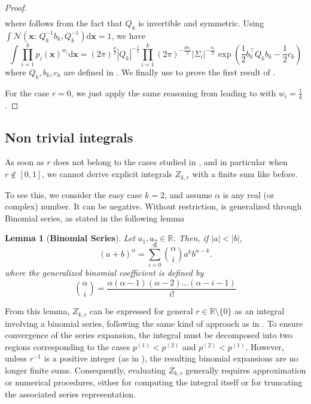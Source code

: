 \documentclass[accepted]{uai2026} %
\newtheorem{lemma}{Lemma}[section]
\newcommand{\R}{\mathbb{R}}
\newcommand{\vx}{\mathbf{x}}
\newcommand{\vd}{\mathrm{d}}
\begin{document}
\begin{proof}
\begin{align}
\end{align}
where  follows from the fact that $Q_k$ is invertible and symmetric. Using $\int\mathcal{N}(\vx; \, Q_k^{-1}b_k, Q_k^{-1}) \vd \vx =1 $, we have
\begin{equation}\label{eq: integral of product}
\int \prod_{i=1}^k p_i(\vx)^{w_i} \vd \vx = (2 \pi)^{\frac{d}{2}} | Q_k |^{-\frac{1}{2}}\prod_{i=1}^k (2\pi)^{-\frac{dw_i}{2}}| \Sigma_i |^{-\frac{w_i}{2}} \exp\left( \frac{1}{2} b_k^\top Q_k b_k -\frac{1}{2} c_k \right)
\end{equation}
where $Q_k,b_k,c_k$ are defined in . We finally use  to prove the first result of .

For the case $r=0$, we just apply the same reasoning from  leading to  with $w_i = \frac{1}{k}$.
\end{proof}


\subsection{Non trivial integrals}\label{not tractable integrals}

As soon as $r$ does not belong to the cases studied in , and in particular when $r \notin [0,1]$, we cannot derive explicit integrals $Z_{k,r}$ with a finite sum like before. 

To see this, we consider the easy case $k=2$, and assume $\alpha$ is any real (or complex) number. It can be negative. Without restriction,  is generalized through Binomial series, as stated in the following lemma

\begin{lemma}[\textbf{Binomial Series}]\label{lemma: binomial series}
Let $a_1,a_2 \in \R$. Then, if $|a| < |b|$,
\begin{equation}
(a+b)^\alpha = \sum_{i = 0}^\infty \binom{\alpha}{i} a^k b^{\alpha-k}. 
\end{equation}
where the generalized binomial coefficient is defined by
\begin{equation}
\binom{\alpha}{i} = \frac{\alpha (\alpha-1)(\alpha-2)\dots (\alpha-i-1)}{i!}
\end{equation}
\end{lemma}

From this lemma, $Z_{k,r}$ can be expressed for general 
$r \in \mathbb{R} \setminus \{0\}$ as an integral involving a binomial series, 
following the same kind of approach as in . 
To ensure convergence of the series expansion, the integral must be decomposed 
into two regions corresponding to the cases $p^{(1)} < p^{(2)}$ and 
$p^{(2)} < p^{(1)}$. However, unless $r^{-1}$ is a positive integer (as in ), 
the resulting binomial expansions are no longer finite sums. Consequently, 
evaluating $Z_{k,r}$ generally requires approximation or numerical procedures, 
either for computing the integral itself or for truncating the associated 
series representation.
\end{document}
